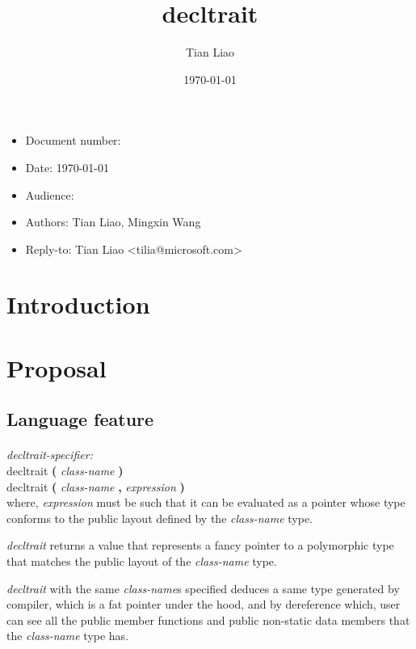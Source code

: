 \documentclass{article}
\title{decltrait}
\author{Tian Liao}
\date{\today}
\begin{document}
\maketitle
\vfill
\begin{itemize}[noitemsep]
  \item[] Document number:
  \item[] Date: \today
  \item[] Audience:
  \item[] Authors: Tian Liao, Mingxin Wang
  \item[] Reply-to: Tian Liao \textless tilia@microsoft.com\textgreater
\end{itemize}

\newpage
{}

\section{Introduction}

\section{Proposal}

\subsection{Language feature}
\paragraph{} \textit{decltrait-specifier:} \\
\indent decltrait \textbf{(} \textit{class-name} \textbf{)} \\
\indent decltrait \textbf{(} \textit{class-name} \textbf{,} \textit{expression} \textbf{)} \\
where, \textit{expression} must be such that it can be evaluated as a pointer whose type conforms to the public layout defined by the \textit{class-name} type.

\textit{decltrait} returns a value that represents a fancy pointer to a polymorphic type that matches the public layout of the \textit{class-name} type.

\textit{decltrait} with the same \textit{class-name}s specified deduces a same type generated by compiler, which is a fat pointer under the hood, and by dereference which, user can see all the public member functions and public non-static data members that the \textit{class-name} type has.
\end{document}
